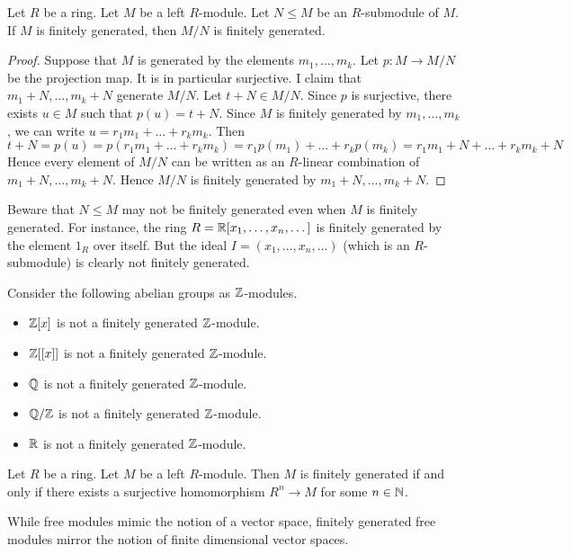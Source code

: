 \documentclass[a4paper]{article}
\begin{document}
\begin{prp}{}{} Let $R$ be a ring. Let $M$ be a left $R$-module. Let $N\leq M$ be an $R$-submodule of $M$. If $M$ is finitely generated, then $M/N$ is finitely generated. 
\begin{proof}
Suppose that $M$ is generated by the elements $m_1,\dots,m_k$. Let $p:M\to M/N$ be the projection map. It is in particular surjective. I claim that $m_1+N,\dots,m_k+N$ generate $M/N$. Let $t+N\in M/N$. Since $p$ is surjective, there exists $u\in M$ such that $p(u)=t+N$. Since $M$ is finitely generated by $m_1,\dots,m_k$, we can write $u=r_1m_1+\dots+r_km_k$. Then $$t+N=p(u)=p(r_1m_1+\dots+r_km_k)=r_1p(m_1)+\dots+r_kp(m_k)=r_1m_1+N+\dots+r_km_k+N$$ Hence every element of $M/N$ can be written as an $R$-linear combination of $m_1+N,\dots,m_k+N$. Hence $M/N$ is finitely generated by $m_1+N,\dots,m_k+N$. 
\end{proof}
\end{prp}

Beware that $N\leq M$ may not be finitely generated even when $M$ is finitely generated. For instance, the ring $R=\mathbb{R}[x_1,\dots,x_n,\dots]$ is finitely generated by the element $1_R$ over itself. But the ideal $I=(x_1,\dots,x_n,\dots)$ (which is an $R$-submodule) is clearly not finitely generated. 

\begin{eg}{}{} Consider the following abelian groups as $\mathbb{Z}$-modules. 
\begin{itemize}
\item $\mathbb{Z}[x]$ is not a finitely generated $\mathbb{Z}$-module. 
\item $\mathbb{Z}[[x]]$ is not a finitely generated $\mathbb{Z}$-module. 
\item $\mathbb{Q}$ is not a finitely generated $\mathbb{Z}$-module. 
\item $\mathbb{Q}/\mathbb{Z}$ is not a finitely generated $\mathbb{Z}$-module. 
\item $\mathbb{R}$ is not a finitely generated $\mathbb{Z}$-module. 
\end{itemize}
\end{eg}

\begin{prp}{}{} Let $R$ be a ring. Let $M$ be a left $R$-module. Then $M$ is finitely generated if and only if there exists a surjective homomorphism $R^n\to M$ for some $n\in\mathbb{N}$. 
\end{prp}

While free modules mimic the notion of a vector space, finitely generated free modules mirror the notion of finite dimensional vector spaces. 
\end{document}
